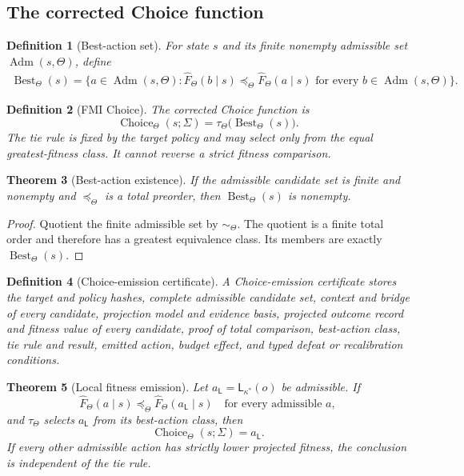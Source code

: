 \documentclass[10pt]{article}
\newtheorem{definition}{Definition}[section]
\newtheorem{theorem}[definition]{Theorem}
\newcommand{\Choice}{\operatorname{Choice}}
\newcommand{\Adm}{\operatorname{Adm}}
\newcommand{\Loc}{\mathsf L}
\newcommand{\Config}{\Sigma}
\newcommand{\Best}{\operatorname{Best}}
\newcommand{\ProjFit}{\widehat F}
\newcommand{\Target}{\Theta}
\begin{document}
\subsection{The corrected Choice function}

\begin{definition}[Best-action set]
For state $s$ and its finite nonempty admissible set $\Adm(s,\Target)$, define
\[
\begin{aligned}
  \Best_\Target(s)=\{a\in\Adm(s,\Target):
  \ProjFit_\Target(b\mid s)
  \preceq_\Target
  \ProjFit_\Target(a\mid s)
  \text{ for every }b\in\Adm(s,\Target)\}.
\end{aligned}
\]
\end{definition}

\begin{definition}[FMI Choice]
The corrected Choice function is
\[
  \boxed{
  \Choice_\Target(s;\Config)
  =\tau_\Target\bigl(\Best_\Target(s)\bigr)}.
\]
The tie rule is fixed by the target policy and may select only from the equal greatest-fitness class.  It cannot reverse a strict fitness comparison.
\end{definition}

\begin{theorem}[Best-action existence]\label{thm:best-existence}
If the admissible candidate set is finite and nonempty and $\preceq_\Target$ is a total preorder, then $\Best_\Target(s)$ is nonempty.
\end{theorem}

\begin{proof}
Quotient the finite admissible set by $\sim_\Target$.  The quotient is a finite total order and therefore has a greatest equivalence class.  Its members are exactly $\Best_\Target(s)$.
\end{proof}

\begin{definition}[Choice-emission certificate]
A Choice-emission certificate stores the target and policy hashes, complete admissible candidate set, context and bridge of every candidate, projection model and evidence basis, projected outcome record and fitness value of every candidate, proof of total comparison, best-action class, tie rule and result, emitted action, budget effect, and typed defeat or recalibration conditions.
\end{definition}

\begin{theorem}[Local fitness emission]\label{thm:local-emission}
Let $a_\Loc=\Loc_{\kappa^*}(o)$ be admissible.  If
\[
  \ProjFit_\Target(a\mid s)
  \preceq_\Target
  \ProjFit_\Target(a_\Loc\mid s)
  \quad\text{for every admissible }a,
\]
and $\tau_\Target$ selects $a_\Loc$ from its best-action class, then
\[
  \Choice_\Target(s;\Config)=a_\Loc.
\]
If every other admissible action has strictly lower projected fitness, the conclusion is independent of the tie rule.
\end{theorem}
\end{document}
